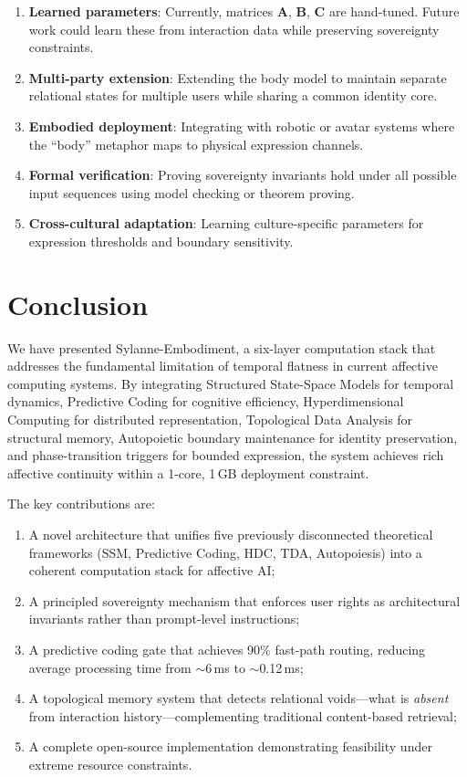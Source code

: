 \documentclass[10pt,twocolumn]{article}
\begin{document}
\begin{enumerate}[nosep,leftmargin=*]
\item \textbf{Learned parameters}: Currently, matrices $\mathbf{A}$, $\mathbf{B}$, $\mathbf{C}$ are hand-tuned. Future work could learn these from interaction data while preserving sovereignty constraints.
\item \textbf{Multi-party extension}: Extending the body model to maintain separate relational states for multiple users while sharing a common identity core.
\item \textbf{Embodied deployment}: Integrating with robotic or avatar systems where the ``body'' metaphor maps to physical expression channels.
\item \textbf{Formal verification}: Proving sovereignty invariants hold under all possible input sequences using model checking or theorem proving.
\item \textbf{Cross-cultural adaptation}: Learning culture-specific parameters for expression thresholds and boundary sensitivity.
\end{enumerate}

\section{Conclusion}
\label{sec:conclusion}

We have presented Sylanne-Embodiment, a six-layer computation stack that addresses the fundamental limitation of temporal flatness in current affective computing systems. By integrating Structured State-Space Models for temporal dynamics, Predictive Coding for cognitive efficiency, Hyperdimensional Computing for distributed representation, Topological Data Analysis for structural memory, Autopoietic boundary maintenance for identity preservation, and phase-transition triggers for bounded expression, the system achieves rich affective continuity within a 1-core, 1\,GB deployment constraint.

The key contributions are:

\begin{enumerate}[nosep,leftmargin=*]
\item A novel architecture that unifies five previously disconnected theoretical frameworks (SSM, Predictive Coding, HDC, TDA, Autopoiesis) into a coherent computation stack for affective AI;
\item A principled sovereignty mechanism that enforces user rights as architectural invariants rather than prompt-level instructions;
\item A predictive coding gate that achieves 90\% fast-path routing, reducing average processing time from $\sim$6\,ms to $\sim$0.12\,ms;
\item A topological memory system that detects relational voids---what is \emph{absent} from interaction history---complementing traditional content-based retrieval;
\item A complete open-source implementation demonstrating feasibility under extreme resource constraints.
\end{enumerate}
\end{document}
